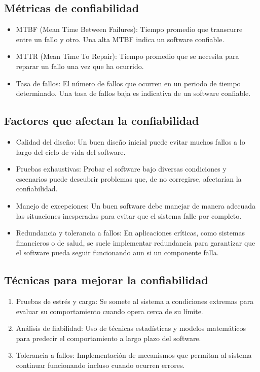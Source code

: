 \documentclass[12pt]{article}
\begin{document}
\subsection*{Métricas de confiabilidad}
\begin{itemize}
    \item MTBF (Mean Time Between Failures): Tiempo promedio que transcurre entre un fallo y otro. Una alta MTBF indica un software confiable.
    \item MTTR (Mean Time To Repair): Tiempo promedio que se necesita para reparar un fallo una vez que ha ocurrido.
    \item Tasa de fallos: El número de fallos que ocurren en un periodo de tiempo determinado. Una tasa de fallos baja es indicativa de un software confiable.
\end{itemize}

\subsection*{Factores que afectan la confiabilidad}
\begin{itemize}
    \item Calidad del diseño: Un buen diseño inicial puede evitar muchos fallos a lo largo del ciclo de vida del software.
    \item Pruebas exhaustivas: Probar el software bajo diversas condiciones y escenarios puede descubrir problemas que, de no corregirse, afectarían la confiabilidad.
    \item Manejo de excepciones: Un buen software debe manejar de manera adecuada las situaciones inesperadas para evitar que el sistema falle por completo.
    \item Redundancia y tolerancia a fallos: En aplicaciones críticas, como sistemas financieros o de salud, se suele implementar redundancia para garantizar que el software pueda seguir funcionando aun si un componente falla.
\end{itemize}

\subsection*{Técnicas para mejorar la confiabilidad}
\begin{enumerate}
    \item Pruebas de estrés y carga: Se somete al sistema a condiciones extremas para evaluar su comportamiento cuando opera cerca de su límite.
    \item Análisis de fiabilidad: Uso de técnicas estadísticas y modelos matemáticos para predecir el comportamiento a largo plazo del software.
    \item Tolerancia a fallos: Implementación de mecanismos que permitan al sistema continuar funcionando incluso cuando ocurren errores.
\end{enumerate}
\end{document}

